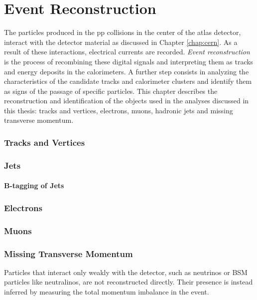 \chapter{Event Reconstruction}
\label{sec:event:reco}

The particles produced in the \acrshort{pp} collisions in the center of the \acrshort{atlas} detector, interact with the detector material as discussed in Chapter \ref{chap:cern}. As a result of these interactions, electrical currents are recorded. \textit{Event reconstruction} is the process of recombining these digital signals and interpreting them as tracks and energy deposits in the calorimeters. A further step consists in analyzing the characteristics of the candidate tracks and calorimeter clusters and identify them as signs of the passage of specific particles.
This chapter describes the reconstruction and identification of the objects used in the analyses discussed in this thesis: tracks and vertices, electrons, muons, hadronic jets and missing transverse momentum. 



\subsection{Tracks and Vertices}
\label{sec:reco:tracks}

\subsection{Jets}

\subsubsection{B-tagging of Jets}


\subsection{Electrons}

\subsection{Muons}

\subsection{Missing Transverse Momentum}

Particles that interact only weakly with the detector, such as neutrinos or BSM particles like neutralinos, are not reconstructed directly. 
Their presence is instead inferred by measuring the total momentum imbalance in the event. 